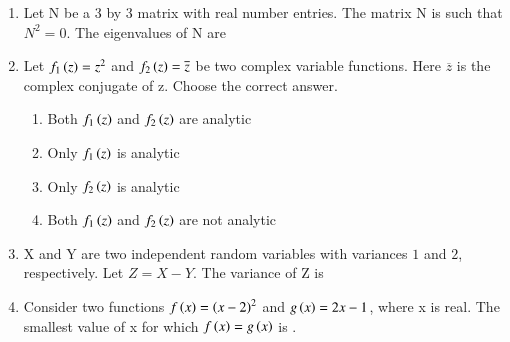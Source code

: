 \documentclass[journal,12pt,onecolumn]{IEEEtran}
\theoremstyle{remark}
\begin{document}
\newpage
\begin{enumerate}
    \item Let N be a $3$ by $3$ matrix with real number entries. The matrix N is such that $N^{2}=0$. The eigenvalues of N are
    
    \hfill{}
    \begin{enumerate}
    \end{enumerate}

    \item Let $f_{1}\left(z\right)=z^{2}$ and $f_{2}\left(z\right)=\overline{z}$ be two complex variable functions. Here $\overline{z}$ is the complex conjugate of z. Choose the correct answer.
    
    \hfill{}
    \begin{enumerate}
        \item Both $f_{1}\left(z\right)$ and $f_{2}\left(z\right)$ are analytic
        \item Only $f_{1}\left(z\right)$ is analytic
        \item Only $f_{2}\left(z\right)$ is analytic
        \item Both $f_{1}\left(z\right)$ and $f_{2}\left(z\right)$ are not analytic
    \end{enumerate}
    
    \item X and Y are two independent random variables with variances $1$ and $2$, respectively. Let $Z=X-Y$. The variance of Z is
    
    \hfill{}
    \begin{enumerate}
    \end{enumerate}
    
    \item Consider two functions $f\left(x\right)=\left(x-2\right)^{2}$ and $g\left(x\right)=2x-1$, where x is real. The smallest value of x for which $f\left(x\right)=g\left(x\right)$ is \underline{\hspace{2cm}}.
    

\end{enumerate}
\end{document}
